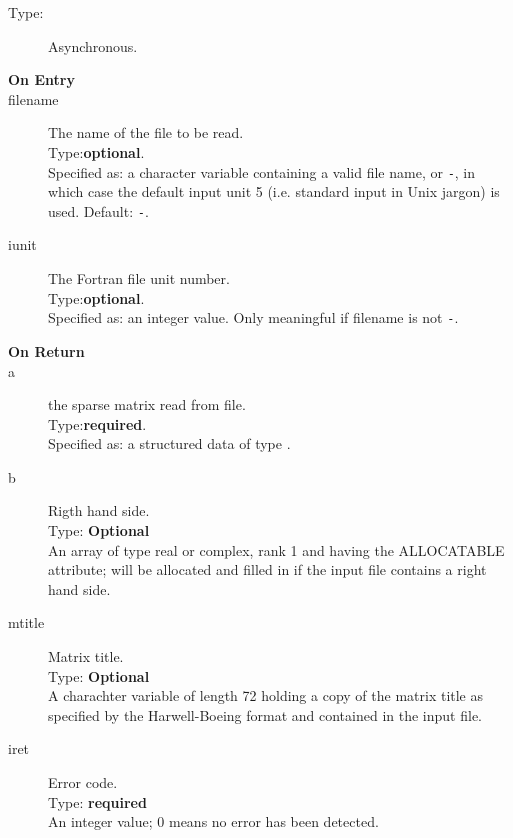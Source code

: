 
 
\begin{description}
\item[Type:] Asynchronous.
\item[\bf  On Entry ]
\item[filename] The name of the file to be read.\\
Type:{\bf optional}.\\
Specified as: a character variable containing a valid file name, or
\verb|-|, in which case the default input unit  5 (i.e. standard input
in Unix jargon) is used. Default: \verb|-|. 
\item[iunit] The Fortran file unit number.\\
Type:{\bf optional}.\\
Specified as: an integer value. Only meaningful if filename is not \verb|-|.
\end{description}

\begin{description}
\item[\bf On Return]
\item[a] the sparse matrix read from file.\\
Type:{\bf required}.\\
Specified as: a structured data of type \spdata.
\item[b] Rigth hand side.\\
Type: {\bf Optional} \\
An  array of type real or complex, rank 1 and having the ALLOCATABLE
attribute; will be allocated and filled in if the input file contains
a right hand side. 
\item[mtitle] Matrix title.\\
Type: {\bf Optional} \\
A charachter variable of length 72 holding a copy of the
matrix title as specified by the Harwell-Boeing format and contained
in the input file.
\item[iret] Error code.\\
Type: {\bf required} \\
An integer value; 0 means no error has been detected. 
\end{description}



